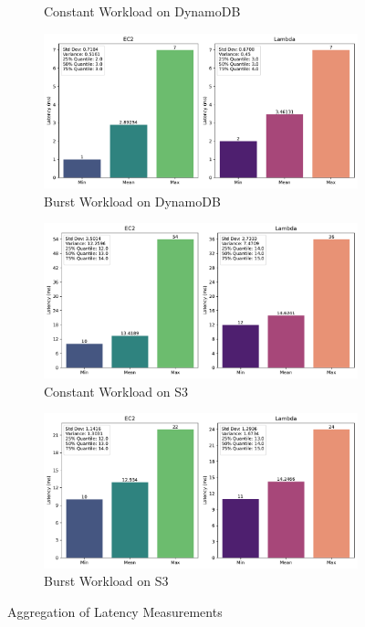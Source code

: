 \begin{figure}[h]
\begin{subfigure}{0.49\linewidth}
		\caption{Constant Workload on DynamoDB}
		\label{fig:bar_ddb_const}
	\end{subfigure}
	\hfill
	\begin{subfigure}{0.49\linewidth}
		\centering
		\includegraphics[width=\linewidth]{./fig/bar-dynamo-bursty.pdf}
		\caption{Burst Workload on DynamoDB}
		\label{fig:bar_ddb_bursty}
	\end{subfigure}
	\vfill
	\begin{subfigure}{0.49\linewidth}
		\centering
		\includegraphics[width=\linewidth]{./fig/bar-s3-constant.pdf}
		\caption{Constant Workload on S3}
		\label{fig:bar_s3_const}
	\end{subfigure}
	\hfill
	\begin{subfigure}{0.49\linewidth}
		\centering
		\includegraphics[width=\linewidth]{./fig/bar-s3-bursty.pdf}
		\caption{Burst Workload on S3}
		\label{fig:bar_s3_bursty}
	\end{subfigure}
	\caption{Aggregation of Latency Measurements}
	\label{fig:bar-plots}
\end{figure}

